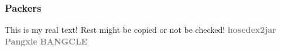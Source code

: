 \subsubsection{Packers}\label{subsubsection:evaluation-reengineering-propack-packers}
This is my real text! Rest might be copied or not be checked!
\newline\newline\textbf{\textcolor{gray}{hosedex2jar}}\newline
\newline\newline\textbf{\textcolor{gray}{Pangxie}}\newline
\newline\newline\textbf{\textcolor{gray}{BANGCLE}}\newline
